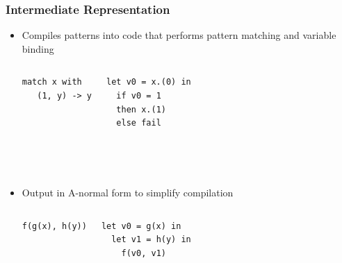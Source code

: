 \documentclass{beamer}
\begin{document}
\begin{frame}[fragile]  \frametitle{Intermediate Representation}
\begin{itemize}
\item Compiles patterns into code that performs pattern matching and variable binding

\begin{columns}[c] %
\begin{verbatim}
match x with
   (1, y) -> y


\end{verbatim}

\begin{verbatim}
let v0 = x.(0) in
  if v0 = 1
  then x.(1)
  else fail
\end{verbatim}
\end{columns} %
\text{} \\
\text{} \\

\item Output in A-normal form to simplify compilation

\begin{columns}[c] 
\begin{verbatim}
f(g(x), h(y))


\end{verbatim}
\begin{verbatim}
let v0 = g(x) in
  let v1 = h(y) in 
    f(v0, v1)
\end{verbatim}
\end{columns}
\end{itemize}
\end{frame}

\end{document}
